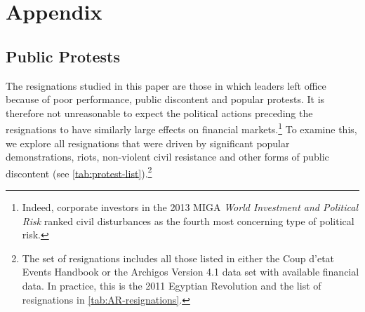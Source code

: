 \documentclass[12pt,final,fleqn]{article}
\theoremstyle{plain}
\begin{document}
\section{Appendix} \label{sec: appendix}

\localtableofcontents
{}%
\renewcommand*{\thepage}{A\arabic{page}}

\newpage


\subsection{Public Protests} \label{subsec: Public Protests}

The resignations studied in this paper are those in which leaders left office because of poor performance, public discontent and popular protests. It is therefore not unreasonable to expect the political actions preceding the resignations to have similarly large effects on financial markets.\footnote{Indeed, corporate investors in the 2013 MIGA \textit{World Investment and Political Risk} ranked civil disturbances as the fourth most concerning type of political risk.} To examine this, we explore all resignations that were driven by significant popular demonstrations, riots, non-violent civil resistance and other forms of public discontent (see \autoref{tab:protest-list}).\footnote{The set of resignations includes all those listed in either the Coup d'etat Events Handbook or the Archigos Version 4.1 data set with available financial data. In practice, this is the 2011 Egyptian Revolution and the list of resignations in \autoref{tab:AR-resignations}.}
\end{document}
